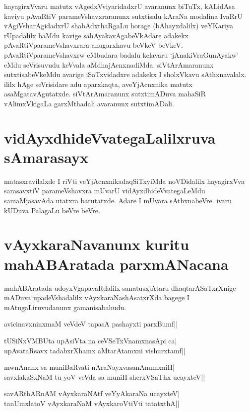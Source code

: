 hayagirxVvaru matutx vAgedxVviyaridadxrU avaranunx biTuTx, kALidAsa kaviyu pAvaRtiV parameVshavxraranunx sutxtisalu kAraNa modalina IvaRrU vAgiVsharAgidadxrU shabAdxthaRgaLu horage (bAhayxdalilx) veYKariya rUpadalilx baMdu kavige sahAyakavAgabeVkAdare adakekx pAvaRtiVparameVshavxrara anugarxhavu beVkeV beVkeV. pAvaRtiVparameVshavxrw eMbudara badalu kelavaru `jAnakiVraGunAyakw' eMdu seVrisuvudu keVvala aMdhajAcnxnadiMda. siVtArAmaranunx sutxtisabeVkeMdu avarige iSaTxvidadxre adakekx I sholxVkavu sAthxnavalalx. ililx hAge seVrisidare adu aparxkaqta, aveYjAcnxnika matutx asaMgatavAgutatxde. siVtArAmaranunx sutxtimADuva mahaSiR vAlimxVkigaLa garxMthadali avaranunx  sutxtimADali.

\section*{vidAyxdhideVvategaLalilxruva sAmarasayx}

matasxravilalxde I riVti veYjAcnxnikadaqSiTxyiMda noVDidalilx hayagirxVva sarasavxtiV parameVshavxra mUvarU vidAyxdhideVvategaLeMdu samaMjasavAda utatxra barutatxde. Adare I mUvara sAthxnabeVre. ivaru kUDuva PalagaLu beVre beVre.
 
\section*{vAyxkaraNavanunx kuritu mahABAratada parxmANacana}

mahABAratada udoyxVgapavaRdalilx sanatusxjAtaru dhaqtarASaTxrXnige mADuva upadeVshadalilx vAyxkaraNashAsatxrXda bagege I mAtugaLiruvudanunx gamanisabahudu.

\begin{shloka}
avicinavxninxmaM veVdeV tapasA pashayxti parxBumf||\label{34}
\end{shloka}

\begin{shloka}
tUSiNxVMBUta upAsiVta na ceVSeTxVnamxnasApi ca|\\
upAvataRsavx tadabxrXhamx aMtarAtamxni vishurxtamf||
\end{shloka}

\begin{shloka}
mwnAnanx sa muniBaRvati nAraNayxvasanAnumxniH|\\
savxlakaSxNaM tu yoV veVda sa muniH sherxVSaThx ucayxteV||
\end{shloka}

\begin{shloka}
savARthARnAM vAyxkaraNAtf veYyAkaraNa ucayxteV|\\
tanUmxlatoV vAyxkaraNaM vAyxkaroVtiVti tatatxthA||
\end{shloka}

